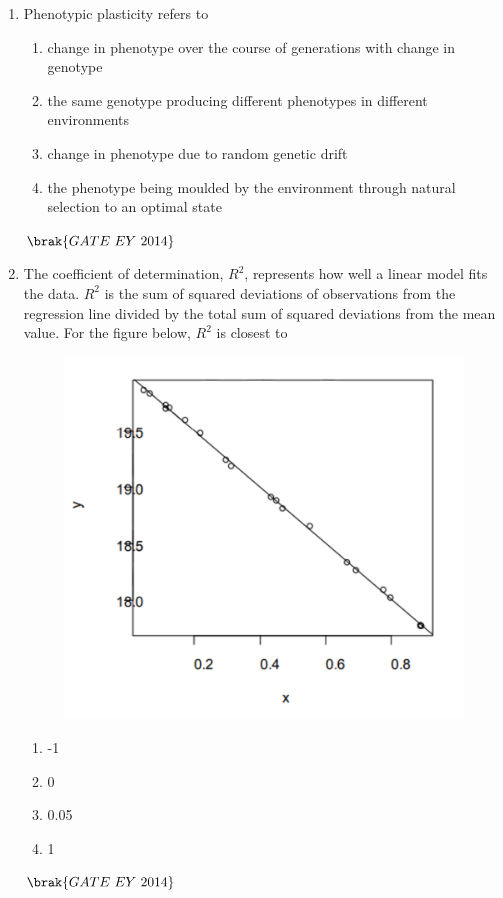 \documentclass[journal]{IEEEtran}
\numberwithin{equation}{enumi}
\numberwithin{figure}{enumi}
\begin{document}
\begin{enumerate}
    \item Phenotypic plasticity refers to
    \begin{enumerate}
        \item change in phenotype over the course of generations with change in genotype
        \item the same genotype producing different phenotypes in different environments
        \item change in phenotype due to random genetic drift
        \item the phenotype being moulded by the environment through natural selection to an optimal state
    \end{enumerate}
    \hfill{$\brak{ GATE\ EY\ 2014}$}
    \bigskip

    \item The coefficient of determination, $R^{2}$, represents how well a linear model fits the data. $R^{2}$ is the sum of squared deviations of observations from the regression line divided by the total sum of squared deviations from the mean value. For the figure below, $R^{2}$ is closest to
    \begin{figure}[H]
    \centering
    \includegraphics[width=0.5\columnwidth]{figs/3.png}
    \caption{}
    \label{fig:3}
   \end{figure}
    \begin{multicols}{4}
    \begin{enumerate}
        \item -1
        \item 0
        \item 0.05
        \item 1
    \end{enumerate}
    \end{multicols}
    \hfill{$\brak{ GATE\ EY\ 2014}$}
    \bigskip


\end{enumerate}
\end{document}
